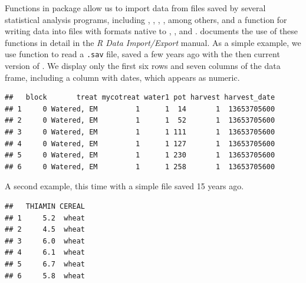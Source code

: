 \documentclass[krantz2]{krantz}\usepackage{knitr}
\begin{document}
Functions in package  allow us to import data from files saved by several statistical analysis programs, including , , , ,  among others, and a function for writing data into files with formats native to , , and . \Rlang documents the use of these functions in detail in the \emph{R Data Import/Export} manual. As a simple example, we use function  to read a \texttt{.sav} file, saved a few years ago with the then current version of . We display only the first six rows and seven columns of the data frame, including a column with dates, which appears as numeric.

\begin{knitrout}\footnotesize
{}\color{fgcolor}\begin{kframe}
\begin{alltt}
 \hlkwb{<-} \hlstd{(} \hlstd{=} \hlstd{,}  \hlstd{=} \hlstd{)}
\end{alltt}


{\ttfamily\noindent\itshape\color{messagecolor}{\#\# re-encoding from UTF-8}}\begin{alltt}
\hlstd{my_spss.df[}\hlopt{:}\hlstd{,} \hlstd{(}\hlopt{:}\hlstd{,} \hlstd{)]}
\end{alltt}
\begin{verbatim}
##   block       treat mycotreat water1 pot harvest harvest_date
## 1     0 Watered, EM         1      1  14       1  13653705600
## 2     0 Watered, EM         1      1  52       1  13653705600
## 3     0 Watered, EM         1      1 111       1  13653705600
## 4     0 Watered, EM         1      1 127       1  13653705600
## 5     0 Watered, EM         1      1 230       1  13653705600
## 6     0 Watered, EM         1      1 258       1  13653705600
\end{verbatim}
\end{kframe}
\end{knitrout}

A second example, this time with a simple  file saved 15 years ago.

\begin{knitrout}\footnotesize
{}\color{fgcolor}\begin{kframe}
\begin{alltt}
 \hlkwb{<-} \hlstd{(} \hlstd{=} \hlstd{,}  \hlstd{=} \hlstd{)}
\end{alltt}
\begin{verbatim}
##   THIAMIN CEREAL
## 1     5.2  wheat
## 2     4.5  wheat
## 3     6.0  wheat
## 4     6.1  wheat
## 5     6.7  wheat
## 6     5.8  wheat
\end{verbatim}
\end{kframe}
\end{knitrout}
\end{document}
